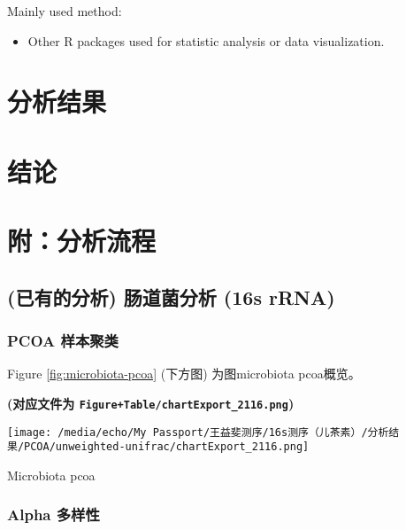 \documentclass[
]{article}
\providecommand{\tightlist}{%
  \setlength{\itemsep}{0pt}\setlength{\parskip}{0pt}}
\begin{document}
Mainly used method:

\begin{itemize}
\tightlist
\item
  Other R packages used for statistic analysis or data visualization.
\end{itemize}

\hypertarget{results}{%
\section{分析结果}\label{results}}

\hypertarget{dis}{%
\section{结论}\label{dis}}

\hypertarget{workflow}{%
\section{附：分析流程}\label{workflow}}

\hypertarget{ux5df2ux6709ux7684ux5206ux6790-ux80a0ux9053ux83ccux5206ux6790-16s-rrna}{%
\subsection{(已有的分析) 肠道菌分析 (16s rRNA)}\label{ux5df2ux6709ux7684ux5206ux6790-ux80a0ux9053ux83ccux5206ux6790-16s-rrna}}

\hypertarget{pcoa-ux6837ux672cux805aux7c7b}{%
\subsubsection{PCOA 样本聚类}\label{pcoa-ux6837ux672cux805aux7c7b}}

Figure \ref{fig:microbiota-pcoa} (下方图) 为图microbiota pcoa概览。

\textbf{(对应文件为 \texttt{Figure+Table/chartExport\_2116.png})}

\def\@captype{figure}
\begin{center}
\texttt{[image: /media/echo/My Passport/王益斐测序/16s测序（儿茶素）/分析结果/PCOA/unweighted-unifrac/chartExport\_2116.png]}
\caption{Microbiota pcoa}\label{fig:microbiota-pcoa}
\end{center}

\hypertarget{alpha-ux591aux6837ux6027}{%
\subsubsection{Alpha 多样性}\label{alpha-ux591aux6837ux6027}}
\end{document}
